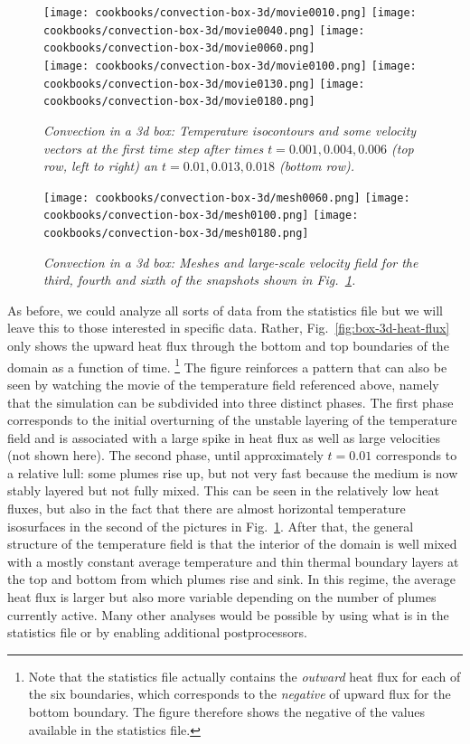\documentclass{article}
\begin{document}
\begin{figure}
  \centering
  \texttt{[image: cookbooks/convection-box-3d/movie0010.png]}
  \hfill
  \texttt{[image: cookbooks/convection-box-3d/movie0040.png]}
  \hfill
  \texttt{[image: cookbooks/convection-box-3d/movie0060.png]}
  \\
  \texttt{[image: cookbooks/convection-box-3d/movie0100.png]}
  \hfill
  \texttt{[image: cookbooks/convection-box-3d/movie0130.png]}
  \hfill
  \texttt{[image: cookbooks/convection-box-3d/movie0180.png]}
  \caption{\it Convection in a 3d box: Temperature isocontours and some
  velocity vectors at the first time step after times $t=0.001, 0.004, 0.006$
  (top row, left to right) an $t=0.01, 0.013, 0.018$ (bottom row).}
  \label{fig:box-3d-solution}
\end{figure}


\begin{figure}
  \centering
  \texttt{[image: cookbooks/convection-box-3d/mesh0060.png]}
  \hfill
  \texttt{[image: cookbooks/convection-box-3d/mesh0100.png]}
  \hfill
  \texttt{[image: cookbooks/convection-box-3d/mesh0180.png]}
  \caption{\it Convection in a 3d box: Meshes and large-scale velocity field
  for the third, fourth and sixth of the snapshots shown in
  Fig.~\ref{fig:box-3d-solution}.}
  \label{fig:box-3d-mesh}
\end{figure}

As before, we could analyze all sorts of data from the statistics file but we
will leave this to those interested in specific data. Rather,
Fig.~\ref{fig:box-3d-heat-flux} only shows the upward heat flux through the
bottom and top boundaries of the domain as a function of time.%
\footnote{Note that the statistics file actually contains the \textit{outward}
heat flux for each of the six boundaries, which corresponds to the
\textit{negative} of upward flux for the bottom boundary. The figure therefore
shows the negative of the values available in the statistics file.}
The figure reinforces a pattern that can also be seen by watching the movie of
the temperature field referenced above, namely that the simulation can be
subdivided into three distinct phases. The first phase corresponds to the
initial overturning of the unstable layering of the temperature field and is
associated with a large spike in heat flux as well as large velocities (not
shown here). The second phase, until approximately $t=0.01$ corresponds to a
relative lull: some plumes rise up, but not very fast because the medium is now
stably layered but not fully mixed. This can be seen in the relatively low heat
fluxes, but also in the fact that there are almost horizontal temperature
isosurfaces in the second of the pictures in Fig.~\ref{fig:box-3d-solution}.
After that, the general structure of the temperature field is that the interior
of the domain is well mixed with a mostly constant average temperature and thin
thermal boundary layers at the top and bottom from which plumes rise and sink.
In this regime, the average heat flux is larger but also more variable depending
on the number of plumes currently active. Many other analyses would be possible
by using what is in the statistics file or by enabling additional
postprocessors.
\end{document}

